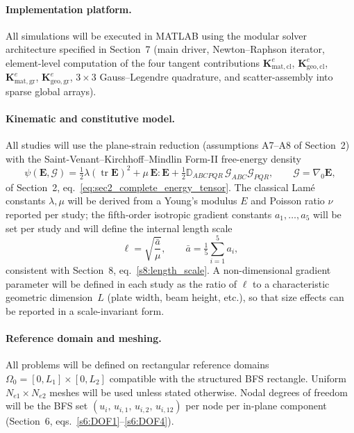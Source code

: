 \documentclass[11pt]{article}
\DeclareMathOperator{\tr}{tr}
\newcommand{\gradz}{\nabla_{0}}
\newcommand{\gradz}{\nabla_{0}}
\begin{document}
\paragraph{Implementation platform.}
All simulations will be executed in MATLAB using the modular solver
architecture specified in Section~7 (main driver, Newton--Raphson
iterator, element-level computation of the four tangent
contributions $\mathbf{K}_{\mathrm{mat,cl}}^{e}$,
$\mathbf{K}_{\mathrm{geo,cl}}^{e}$, $\mathbf{K}_{\mathrm{mat,gr}}^{e}$,
$\mathbf{K}_{\mathrm{geo,gr}}^{e}$, $3\times3$ Gauss--Legendre
quadrature, and scatter-assembly into sparse global arrays).

\paragraph{Kinematic and constitutive model.}
All studies will use the plane-strain reduction (assumptions A7--A8 of
Section~2) with the Saint-Venant--Kirchhoff--Mindlin Form-II
free-energy density
\begin{equation}
\psi(\mathbf{E},\bm{\mathcal{G}})
  = \tfrac12\lambda(\tr\mathbf{E})^{2}
  + \mu\,\mathbf{E}{:}\mathbf{E}
  + \tfrac12\mathbb{D}_{ABCPQR}\,\mathcal{G}_{ABC}\mathcal{G}_{PQR},
\qquad \bm{\mathcal{G}}=\gradz\mathbf{E},
\end{equation}
of Section~2, eq.~\eqref{eq:sec2_complete_energy_tensor}.  The
classical Lam\'e constants $\lambda,\mu$ will be derived from a
Young's modulus $E$ and Poisson ratio $\nu$ reported per study;
the fifth-order isotropic gradient constants $a_{1},\ldots,a_{5}$
will be set per study and will define the internal length scale
\begin{equation}
\ell = \sqrt{\frac{\bar{a}}{\mu}},\qquad
\bar{a} = \tfrac{1}{5}\sum_{i=1}^{5}a_{i},
\end{equation}
consistent with Section~8, eq.~\eqref{s8:length_scale}.  A
non-dimensional gradient parameter will be defined in each study as
the ratio of $\ell$ to a characteristic geometric dimension~$L$
(plate width, beam height, etc.), so that size effects can be
reported in a scale-invariant form.

\paragraph{Reference domain and meshing.}
All problems will be defined on rectangular reference domains
$\Omega_{0}=[0,L_{1}]\times[0,L_{2}]$ compatible with the structured
BFS rectangle.  Uniform $N_{e1}\times N_{e2}$ meshes will be used
unless stated otherwise.  Nodal degrees of freedom will be the BFS
set $(u_{i},\,u_{i,1},\,u_{i,2},\,u_{i,12})$ per node per in-plane
component (Section~6, eqs.~\eqref{s6:DOF1}--\eqref{s6:DOF4}).
\end{document}
